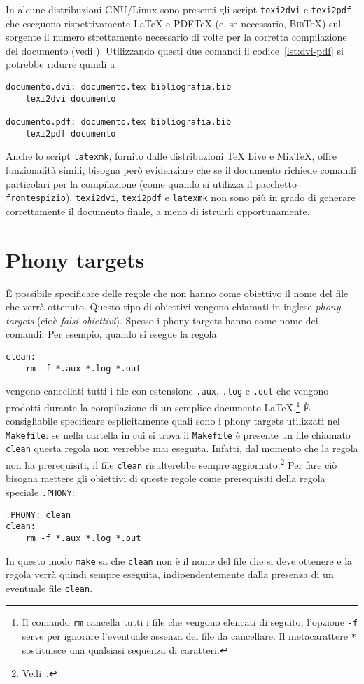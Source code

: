 In alcune distribuzioni GNU/Linux sono presenti gli script \texttt{texi2dvi} e
\texttt{texi2pdf} che eseguono rispettivamente \LaTeX{}
e \textsc{PDF}\TeX{}
(e, se necessario, \textsc{Bib}\TeX) sul sorgente il numero strettamente
necessario di volte per la corretta compilazione del documento (vedi
\cite[pagina 63]{caucci:tabelle}).  Utilizzando questi due comandi il
codice~\ref{lst:dvi-pdf} si potrebbe ridurre quindi a
\begin{lstlisting}
documento.dvi: documento.tex bibliografia.bib
	texi2dvi documento

documento.pdf: documento.tex bibliografia.bib
	texi2pdf documento
\end{lstlisting}
Anche lo script \texttt{latexmk}, fornito dalle distribuzioni TeX Live e MikTeX,
offre funzionalità simili, bisogna però evidenziare che se il documento richiede
comandi particolari per la compilazione (come quando si utilizza il pacchetto
\texttt{frontespizio}), \texttt{texi2dvi}, \texttt{texi2pdf} e \texttt{latexmk}
non sono più in grado di generare correttamente il documento finale, a meno di
istruirli opportunamente.

\section{Phony targets}
\label{sec:phony}

È possibile specificare delle regole che non hanno come obiettivo il nome del
file che verrà ottenuto.  Questo tipo di obiettivi vengono chiamati in inglese
\emph{phony targets} (cioè \emph{falsi obiettivi}).  Spesso i phony targets
hanno come nome dei comandi. Per esempio, quando si esegue la regola
\begin{lstlisting}
clean:
	rm -f *.aux *.log *.out
\end{lstlisting}
vengono cancellati tutti i file con estensione \texttt{.aux}, \texttt{.log} e
\texttt{.out} che vengono prodotti durante la compilazione di un semplice
documento
\LaTeX.\footnote{Il comando \texttt{rm} cancella tutti i file che vengono
  elencati di seguito, l'opzione \texttt{-f} serve per ignorare l'eventuale
  assenza dei file da cancellare.  Il metacarattere \texttt{*} sostituisce una
  qualsiasi sequenza di caratteri.}
È consigliabile specificare esplicitamente quali sono i phony targets utilizzati
nel \texttt{Makefile}: se nella cartella in cui si trova il \texttt{Makefile} è
presente un file chiamato \texttt{clean} questa regola non verrebbe mai
eseguita.  Infatti, dal momento che la regola non ha prerequisiti, il file
\texttt{clean} risulterebbe sempre
aggiornato.\footnote{Vedi~\cite[pagina 31]{gnu:make}.}  Per fare ciò bisogna
mettere gli obiettivi di queste regole come prerequisiti della regola speciale
\texttt{.PHONY}:
\begin{lstlisting}
.PHONY: clean
clean:
	rm -f *.aux *.log *.out
\end{lstlisting}
In questo modo \texttt{make} sa che \texttt{clean} non è il nome del file che si
deve ottenere e la regola verrà quindi sempre eseguita, indipendentemente dalla
presenza di un eventuale file \texttt{clean}.

